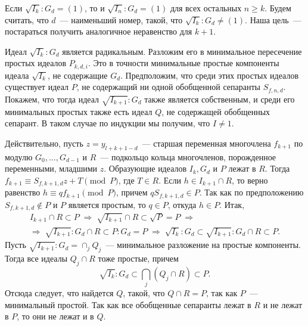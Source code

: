 \documentclass[a4paper,12pt,russian]{amsart}
\renewcommand{\ge}{\geqslant}
\theoremstyle{definition}
\begin{document}
Если $\sqrt{I_k} : G_d = (1)$, то и $\sqrt{I_n} : G_d = (1)$ для всех остальных $n \ge k$.
Будем считать, что $d$~--- наименьший номер, такой, что $\sqrt{I_k} : G_d \ne (1)$.
Наша цель~--- постараться получить аналогичное неравенство для $k+1$.

Идеал $\sqrt{I_k} : G_d$ является радикальным. Разложим его в минимальное пересечение простых идеалов $P_{k,d,i}$.
Это в точности минимальные простые компоненты идеала $\sqrt{I_k}$, не содержащие $G_d$.
Предположим, что среди этих простых идеалов существует идеал $P$, не содержащий ни одной обобщенной сепаранты $S_{f,n,d}$.
Покажем, что тогда идеал $\sqrt{I_{k+1}}:G_d$ также является собственным, и среди его минимальных простых также есть идеал $Q$,
не содержащей обобщенных сепарант. В таком случае по индукции мы получим, что $I \ne 1$.

Действительно, пусть $z = y_{l+k+1-d}$~--- старшая переменная многочлена $f_{k+1}$ по модулю $G_0, \ldots, G_{d-1}$
и $R$~--- подкольцо кольца многочленов, порожденное переменными, младшими $z$. 
Образующие идеалов $I_k, G_d$ и $P$ лежат в $R$.
Тогда $f_{k+1} \equiv S_{f,k+1,d} z + T \pmod P$, где $T \in R$.
Если $h \in I_{k+1} \cap R$, то верно равенство
$h \equiv q f_{k+1} \pmod P$, причем $q S_{f,k+1,d} \in P$.
Так как по предположению $S_{f,k+1,d} \notin P$ и $P$ является простым, то $q \in P$,
откуда $h \in P$. Итак,
\begin{gather*}
 I_{k+1} \cap R \subset P \; \Longrightarrow \; \sqrt{I_{k+1}} \cap R \subset \sqrt{P} = P \; \Longrightarrow \\
 \Longrightarrow \; \sqrt{I_{k+1}}:G_d \cap R \subset P:G_d = P \; \Longrightarrow \; \sqrt{I_k}:G_d \subset \sqrt{I_{k+1}}:G_d \cap R \subset P.
\end{gather*}
Пусть $\sqrt{I_{k+1}}:G_d = \cap_j Q_j$~--- минимальное разложение на простые компоненты.
Тогда все идеалы $Q_j \cap R$ тоже простые, причем
$$
 \sqrt{I_k}:G_d \subset \bigcap_j \left( Q_j \cap R \right) \subset P.
$$
Отсюда следует, что найдется $Q$, такой, что $Q \cap R = P$, так как $P$~--- минимальный простой.
Так как все обобщенные сепаранты лежат в $R$ и не лежат в $P$, то они не лежат и в $Q$.

\bigskip
\end{document}
